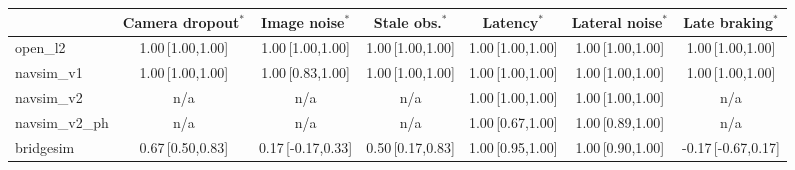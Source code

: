 \begin{tabular}{@{}lcccccc@{}}
\toprule
 & Camera dropout$^{\ast}$ & Image noise$^{\ast}$ & Stale obs.$^{\ast}$ & Latency$^{\ast}$ & Lateral noise$^{\ast}$ & Late braking$^{\ast}$ \\
\midrule
open\_l2 & 1.00\,{\scriptsize[1.00,1.00]} & 1.00\,{\scriptsize[1.00,1.00]} & 1.00\,{\scriptsize[1.00,1.00]} & 1.00\,{\scriptsize[1.00,1.00]} & 1.00\,{\scriptsize[1.00,1.00]} & 1.00\,{\scriptsize[1.00,1.00]} \\
navsim\_v1 & 1.00\,{\scriptsize[1.00,1.00]} & 1.00\,{\scriptsize[0.83,1.00]} & 1.00\,{\scriptsize[1.00,1.00]} & 1.00\,{\scriptsize[1.00,1.00]} & 1.00\,{\scriptsize[1.00,1.00]} & 1.00\,{\scriptsize[1.00,1.00]} \\
navsim\_v2 & n/a & n/a & n/a & 1.00\,{\scriptsize[1.00,1.00]} & 1.00\,{\scriptsize[1.00,1.00]} & n/a \\
navsim\_v2\_ph & n/a & n/a & n/a & 1.00\,{\scriptsize[0.67,1.00]} & 1.00\,{\scriptsize[0.89,1.00]} & n/a \\
bridgesim & 0.67\,{\scriptsize[0.50,0.83]} & 0.17\,{\scriptsize[-0.17,0.33]} & 0.50\,{\scriptsize[0.17,0.83]} & 1.00\,{\scriptsize[0.95,1.00]} & 1.00\,{\scriptsize[0.90,1.00]} & -0.17\,{\scriptsize[-0.67,0.17]} \\
\bottomrule
\end{tabular}
